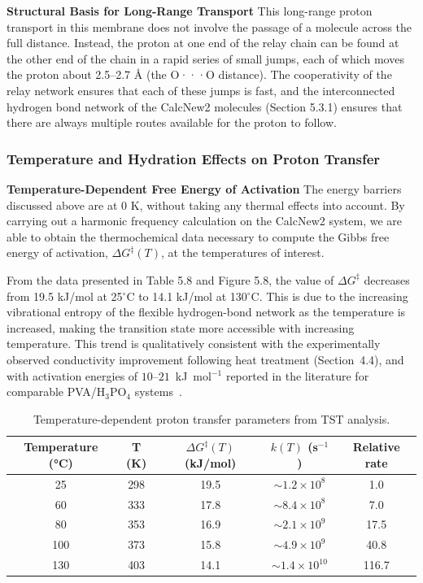 \documentclass[12pt,a4paper]{report}
\begin{document}
\textbf{Structural Basis for Long-Range Transport}
This long-range proton transport in this membrane does not involve the passage of a molecule across the full distance. Instead, the proton at one end of the relay chain can be found at the other end of the chain in a rapid series of small jumps, each of which moves the proton about 2.5–2.7 Å (the O···O distance). The cooperativity of the relay network ensures that each of these jumps is fast, and the interconnected hydrogen bond network of the CalcNew2 molecules (Section 5.3.1) ensures that there are always multiple routes available for the proton to follow.\cite{61,62,63,64}

\subsubsection{Temperature and Hydration Effects on Proton Transfer}

\textbf{Temperature-Dependent Free Energy of Activation}
The energy barriers discussed above are at 0 K, without taking any thermal effects into account. By carrying out a harmonic frequency calculation on the CalcNew2 system, we are able to obtain the thermochemical data necessary to compute the Gibbs free energy of activation, \(\Delta G^{\ddagger}(T)\), at the temperatures of interest.\cite{92, 93}

From the data presented in Table 5.8 and Figure 5.8, the value of \(\Delta G^{\ddagger}\) decreases from 19.5 kJ/mol at 25\(^\circ\)C to 14.1 kJ/mol at 130\(^\circ\)C. This is due to the increasing vibrational entropy of the flexible hydrogen-bond network as the temperature is increased, making the transition state more accessible with increasing temperature. This trend is qualitatively consistent with the experimentally observed conductivity improvement following heat treatment (Section~4.4), and with activation energies of $10$--$21$~kJ~mol$^{-1}$ reported in the literature for comparable PVA/H$_3$PO$_4$ systems~\cite{57,58,60}.

\begin{table}[h!]
\centering
\caption{Temperature-dependent proton transfer parameters from TST analysis.}
\label{tab:temperature-dependence}
\begin{tabular}{c c c c c}
\toprule
Temperature (°C) & T (K) & \(\Delta G^{\ddagger}(T)\) (kJ/mol) & \(k(T)\) (s\(^{-1}\)) & Relative rate \\
\midrule
25  & 298 & 19.5 & \(\sim 1.2 \times 10^{8}\)  & 1.0   \\
60  & 333 & 17.8 & \(\sim 8.4 \times 10^{8}\)  & 7.0   \\
80  & 353 & 16.9 & \(\sim 2.1 \times 10^{9}\)  & 17.5  \\
100 & 373 & 15.8 & \(\sim 4.9 \times 10^{9}\)  & 40.8  \\
130 & 403 & 14.1 & \(\sim 1.4 \times 10^{10}\) & 116.7 \\
\bottomrule
\end{tabular}
\end{table}
\end{document}
